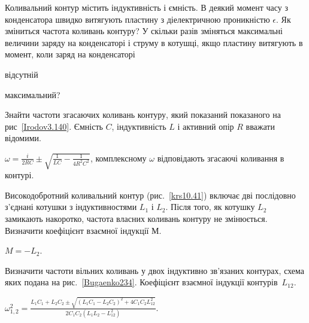 \begin{problem}%
Коливальний контур містить індуктивність і ємність. В деякий момент часу з конденсатора швидко витягують пластину з діелектричною проникністю $\epsilon$. Як зміниться частота коливань контуру? У скільки разів зміняться максимальні величини заряду на конденсаторі і струму в котушці, якщо пластину витягують в момент, коли заряд на конденсаторі
\begin{enumerate*}[label=\alph*)]
	\item відсутній
	\item максимальний?
\end{enumerate*}
\end{problem}

\begin{problem}\label{prb:Irodov3.140}
Знайти частоти згасаючих коливань контуру, який показаний показаного на рис~\ref{Irodov3.140}. Ємність $C$, індуктивність $L$ і активний опір $R$ вважати відомими.
\begin{solution}
	$\omega = \frac{i}{2RC} \pm \sqrt{\frac{1}{LC} - \frac{1}{4R^2C^2}}$, комплексному $\omega$ відповідають згасаючі коливання в контурі.
\end{solution}
\end{problem}

\begin{problem}\label{prb:krs10.41} %
Високодобротний коливальний контур (рис.~\ref{krs10.41}) включає дві послідовно з'єднані котушки з індуктивностями $L_1$ і $L_2$. Після того, як котушку $L_2$ замикають накоротко, частота власних коливань контуру не змінюється. Визначити коефіцієнт взаємної індукції $М$.
\begin{solution}
	$M = -L_2$.
\end{solution}
\end{problem}

\begin{problem}\label{prb:Bugaenko234}
Визначити частоти вільних коливань у двох індуктивно зв'язаних контурах, схема яких подана на рис.~\ref{Bugaenko234}. Коефіцієнт взаємної індукції контурів~$L_{12}$.
\begin{solution}
	$\omega_{1,2}^2 = \frac{L_1C_1 + L_2C_2 \pm \sqrt{(L_1C_1 - L_2C_2)^2 + 4C_1C_2L_{12}^2}}{2C_1C_2(L_1L_2 - L_{12}^2)}$.
\end{solution}
\end{problem}

